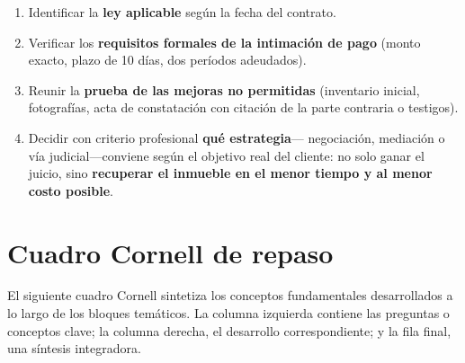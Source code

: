 \documentclass[12pt,oneside]{book}
\begin{document}
\begin{enumerate}
    \item Identificar la \textbf{ley aplicable} según la fecha del contrato.
    \item Verificar los \textbf{requisitos formales de la intimación de
    pago} (monto exacto, plazo de 10 días, dos períodos adeudados).
    \item Reunir la \textbf{prueba de las mejoras no permitidas}
    (inventario inicial, fotografías, acta de constatación con citación
    de la parte contraria o testigos).
    \item Decidir con criterio profesional \textbf{qué estrategia}---
    negociación, mediación o vía judicial---conviene según el objetivo
    real del cliente: no solo ganar el juicio, sino \textbf{recuperar
    el inmueble en el menor tiempo y al menor costo posible}.
\end{enumerate}

\chapter{Cuadro Cornell de repaso}

El siguiente cuadro Cornell sintetiza los conceptos fundamentales
desarrollados a lo largo de los bloques temáticos. La columna izquierda
contiene las preguntas o conceptos clave; la columna derecha, el
desarrollo correspondiente; y la fila final, una síntesis integradora.
\end{document}
